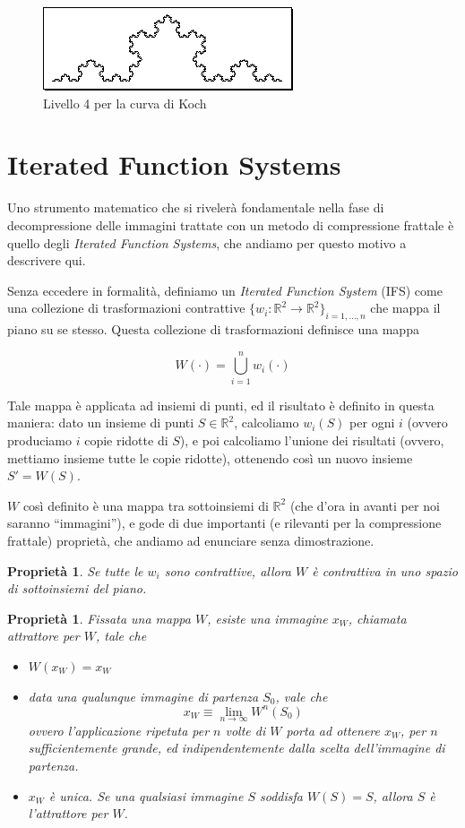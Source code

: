 \documentclass[11pt,a4paper,appendixprefix=true,numbers=noenddot]{scrreprt}
\newtheorem{proprieta}[teorema]{Proprietà}
\begin{document}
\begin{figure}[!ht]
\centering
\includegraphics[scale=0.55]{images/koch4.png}
\caption{Livello 4 per la curva di Koch}
\label{fig:k4}
\end{figure}



\section{Iterated Function Systems}

Uno strumento matematico che si rivelerà fondamentale nella fase di decompressione delle immagini trattate con un metodo di compressione frattale è quello degli \emph{Iterated Function Systems}, che andiamo per questo motivo a descrivere qui.

Senza eccedere in formalità, definiamo un \emph{Iterated Function System} (IFS) come una collezione di trasformazioni contrattive $\{w_i : \mathbb{R}^2 \rightarrow \mathbb{R}^2 \}_{i=1,\ldots, n}$ che mappa il piano su se stesso. Questa collezione di trasformazioni definisce una mappa 

\[
W(\cdot) = \bigcup_{i=1}^{n} w_i(\cdot)
\]

Tale mappa è applicata ad insiemi di punti, ed il risultato è definito in questa maniera: dato un insieme di punti $S \in \mathbb{R}^2$, calcoliamo $w_i(S)$ per ogni $i$ (ovvero produciamo $i$ copie ridotte di $S$), e poi calcoliamo l'unione dei risultati (ovvero, mettiamo insieme tutte le copie ridotte), ottenendo così un nuovo insieme $S' = W(S)$.

$W$ così definito è una mappa tra sottoinsiemi di $\mathbb{R}^2$ (che d'ora in avanti per noi saranno ``immagini''), e gode di due importanti (e rilevanti per la compressione frattale) proprietà, che andiamo ad enunciare senza dimostrazione.

\begin{proprieta}
Se tutte le $w_i$ sono contrattive, allora $W$ è contrattiva in uno spazio di sottoinsiemi del piano.
\end{proprieta}

\begin{proprieta}
Fissata una mappa $W$, esiste una immagine $x_W$, chiamata \emph{attrattore per $W$}, tale che
\begin{itemize}
\item $W(x_W) = x_W$
\item data una qualunque immagine di partenza $S_0$, vale che 
\[x_W \equiv \lim_{n \rightarrow \infty} W^{n}(S_0) \]
ovvero l'applicazione ripetuta per $n$ volte di $W$ porta ad ottenere $x_W$, per $n$ sufficientemente grande, ed indipendentemente dalla scelta dell'immagine di partenza.
\item $x_W$ è unica. Se una qualsiasi immagine $S$ soddisfa $W(S) = S$, allora $S$ è l'attrattore per $W$.
\end{itemize}
\end{proprieta}
\end{document}
